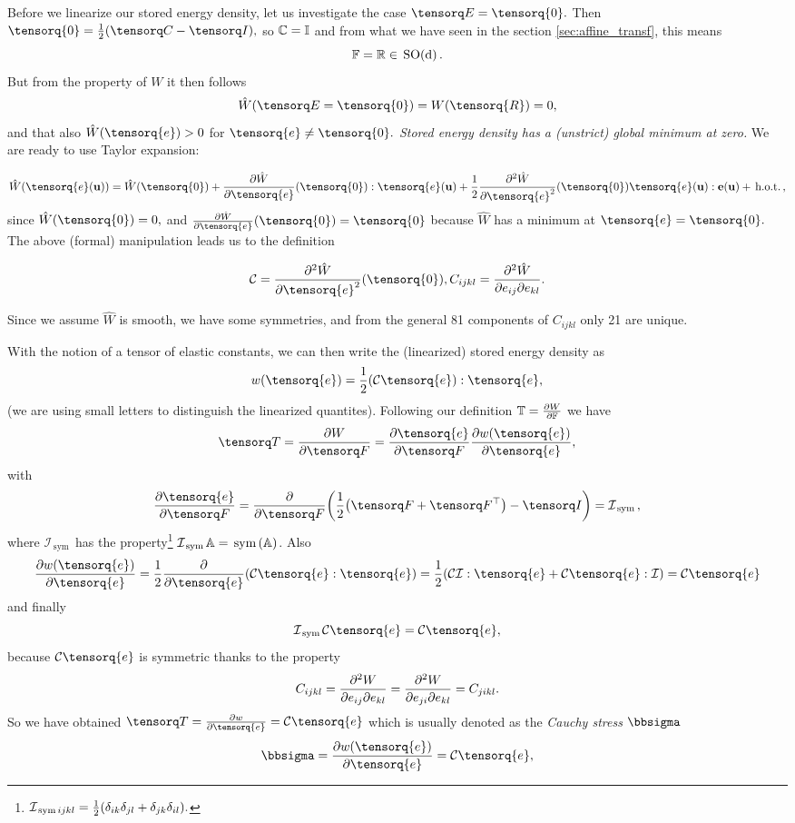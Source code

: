 \documentclass[11pt]{scrartcl} %
\begin{document}
Before we linearize our stored energy density, let us investigate the case $\gsv = \tensorq{0}.$ Then $\tensorq{0} = \frac{1}{2}\qty(\rcg - \identityM),$ so $\mathbb{C} = \mathbb{I}$ and from what we have seen in the section \ref{sec:affine_transf}, this means
\[
	\mathbb{F} = \mathbb{R} \in \, \text{SO(d)} \,.
\]
But from the property of $W$ it then follows
\[
	\hat{W}\qty(\gsv = \tensorq{0}) = W\qty(\tensorq{R}) = 0,
\]
and that also $\hat{W}(\tensorq{e}) > 0$ for $\tensorq{e} \neq \tensorq{0}.$ \textit{Stored energy density has a (unstrict) global minimum at zero.}
We are ready to use Taylor expansion:

\[
	\hat{W}\qty(\tensorq{e}\qty(\vb{u}))= \hat{W}\qty(\tensorq{0})+ \pdv{\hat{W}}{\tensorq{e}}\qty(\tensorq{0}):\tensorq{e}\qty(\vb{u})+\frac{1}{2}\pdv[2]{\hat{W}}{\tensorq{e}}\qty(\tensorq{0})\tensorq{e}\qty(\vb{u}) :\vb{e}\qty(\vb{u}) + \, \text{h.o.t.} \,,
\]
since $\hat{W}\qty(\tensorq{0}) = 0,$ and $\pdv{\hat{W}}{\tensorq{e}}\qty(\tensorq{0}) = \tensorq{0}$ because $\hat{W}$ has a minimum at $\tensorq{e} = \tensorq{0}.$ The above (formal) manipulation leads us to the definition
\begin{definition}
	\[
	\mathcal{C} = \pdv[2]{\hat{W}}{\tensorq{e}}\qty(\tensorq{0}), C_{ijkl} = \pdv[2]{\hat{W}}{e_{ij}}{e_{kl}}.
	\]
\end{definition}
\begin{remark}
    Since we assume $\hat{W}$ is smooth, we have some symmetries, and from the general 81 components of $C_{ijkl}$ only 21 are unique.
\end{remark}

With the notion of a tensor of elastic constants, we can then write the (linearized) stored energy density as
\[
	w\qty(\tensorq{e}) = \frac{1}{2}(\mathcal{C}\tensorq{e}):\tensorq{e},
\]
(we are using small letters to distinguish the linearized quantites). 
Following our definition $\mathbb{T} = \pdv{W}{\ensuremath{\mathbb{F}}}$ we have
\[
	\pkstress = \pdv{W}{\fgrad} = \pdv{\tensorq{e}}{\fgrad}\pdv{w\qty(\tensorq{e})}{\tensorq{e}},
\]
with
\[
	\pdv{\tensorq{e}}{\fgrad} = \pdv{\fgrad}\qty(\frac{1}{2}\qty(\fgrad + \transpose{\fgrad}) - \identityM) =\mathcal{I}_{\, \text{sym} \,},
\]
where $\mathcal{I}_{\, \text{sym} \,}$ has the property\footnote{$\mathcal{I}_{\, \text{sym} \,ijkl} = \frac{1}{2}\qty(\delta_{ik}\delta_{jl} + \delta_{jk}\delta_{il}).$} $\mathcal{I}_{\, \text{sym} \,}\mathbb{A} = \, \text{sym} \,\qty(\mathbb{A})$. Also
\[
	\pdv{w\qty(\tensorq{e})}{\tensorq{e}} = \frac{1}{2} \pdv{\tensorq{e}} \qty(\mathcal{C}\tensorq{e}: \tensorq{e}) = \frac{1}{2}\qty(\mathcal{C}\mathcal{I}: \tensorq{e} + \mathcal{C}\tensorq{e}: \mathcal{I}) = \mathcal{C}\tensorq{e}
\]
and finally
\[
	\mathcal{I}_{\, \text{sym} \,}\mathcal{C}\tensorq{e} = \mathcal{C}\tensorq{e},
\]
because $\mathcal{C}\tensorq{e}$ is symmetric thanks to the property
\[
	C_{ijkl} = \pdv{W}{e_{ij}}{e_{kl}}= \pdv{W}{e_{ji}}{e_{kl}} = C_{jikl}.
\]
So we have obtained $\pkstress = \pdv{w}{\tensorq{e}} = \mathcal{C}\tensorq{e}$ which is usually denoted as the \textit{Cauchy stress} $\bbsigma$
\[
	\bbsigma = \pdv{w\qty(\tensorq{e})}{\tensorq{e}} = \mathcal{C}\tensorq{e}, 
\]
 
\end{document}
